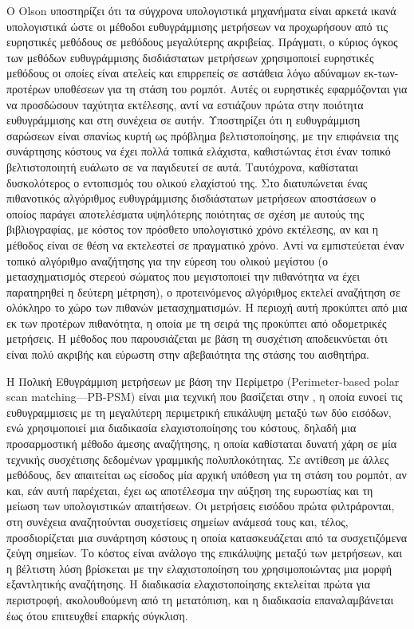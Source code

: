 Ο Olson \cite{Olson2009a} υποστηρίζει ότι τα σύγχρονα υπολογιστικά μηχανήματα
είναι αρκετά ικανά υπολογιστικά ώστε οι μέθοδοι ευθυγράμμισης μετρήσεων να
προχωρήσουν από τις ευρηστικές μεθόδους σε μεθόδους μεγαλύτερης ακριβείας.
Πράγματι, ο κύριος όγκος των μεθόδων ευθυγράμμισης δισδιάστατων μετρήσεων
χρησιμοποιεί ευρηστικές μεθόδους οι οποίες είναι ατελείς και επιρρεπείς σε
αστάθεια λόγω αδύναμων εκ-των-προτέρων υποθέσεων για τη στάση του ρομπότ. Αυτές
οι ευρηστικές εφαρμόζονται για να προσδώσουν ταχύτητα εκτέλεσης, αντί να
εστιάζουν πρώτα στην ποιότητα ευθυγράμμισης και στη συνέχεια σε αυτήν.
Υποστηρίζει ότι η ευθυγράμμιση σαρώσεων είναι σπανίως κυρτή ως πρόβλημα
βελτιστοποίησης, με την επιφάνεια της συνάρτησης κόστους να έχει πολλά τοπικά
ελάχιστα, καθιστώντας έτσι έναν τοπικό βελτιστοποιητή ευάλωτο σε να παγιδευτεί
σε αυτά. Ταυτόχρονα, καθίσταται δυσκολότερος ο εντοπισμός του ολικού ελαχίστού
της. Στο \cite{Olson2009a} διατυπώνεται ένας πιθανοτικός αλγόριθμος
ευθυγράμμισης δισδιάστατων μετρήσεων αποστάσεων ο οποίος παράγει αποτελέσματα
υψηλότερης ποιότητας σε σχέση με αυτούς της βιβλιογραφίας, με κόστος τον
πρόσθετο υπολογιστικό χρόνο εκτέλεσης, αν και η μέθοδος είναι σε θέση να
εκτελεστεί σε πραγματικό χρόνο.  Αντί να εμπιστεύεται έναν τοπικό αλγόριθμο
αναζήτησης για την εύρεση του ολικού μεγίστου (ο μετασχηματισμός στερεού
σώματος που μεγιστοποιεί την πιθανότητα να έχει παρατηρηθεί η δεύτερη μέτρηση),
ο προτεινόμενος αλγόριθμος εκτελεί αναζήτηση σε ολόκληρο το χώρο των πιθανών
μετασχηματισμών. Η περιοχή αυτή προκύπτει από μια εκ των προτέρων πιθανότητα, η
οποία με τη σειρά της προκύπτει από οδομετρικές μετρήσεις. Η μέθοδος που
παρουσιάζεται με βάση τη συσχέτιση αποδεικνύεται ότι είναι πολύ ακριβής και
εύρωστη στην αβεβαιότητα της στάσης του αισθητήρα.

Η Πολική Εθυγράμμιση μετρήσεων με βάση την Περίμετρο (Perimeter-based polar
scan matching---PB-PSM) \cite{Friedman2015} είναι μια τεχνική που βασίζεται
στην \cite{Diosi2005}, η οποία ευνοεί τις ευθυγραμμισεις με τη μεγαλύτερη
περιμετρική επικάλυψη μεταξύ των δύο εισόδων, ενώ χρησιμοποιεί μια διαδικασία
ελαχιστοποίησης του κόστους, δηλαδή μια προσαρμοστική μέθοδο άμεσης αναζήτησης,
η οποία καθίσταται δυνατή χάρη σε μία τεχνικής συσχέτισης δεδομένων γραμμικής
πολυπλοκότητας. Σε αντίθεση με άλλες μεθόδους, δεν απαιτείται ως είσοδος μία
αρχική υπόθεση για τη στάση του ρομπότ, αν και, εάν αυτή παρέχεται, έχει ως
αποτέλεσμα την αύξηση της ευρωστίας και τη μείωση των υπολογιστικών απαιτήσεων.
Οι μετρήσεις εισόδου πρώτα φιλτράρονται, στη συνέχεια αναζητούνται συσχετίσεις
σημείων ανάμεσά τους και, τέλος, προσδιορίζεται μια συνάρτηση κόστους η οποία
κατασκευάζεται από τα συσχετιζόμενα ζεύγη σημείων. Το κόστος είναι ανάλογο της
επικάλυψης μεταξύ των μετρήσεων, και η βέλτιστη λύση βρίσκεται με την
ελαχιστοποίηση του χρησιμοποιώντας μια μορφή εξαντλητικής αναζήτησης. Η
διαδικασία ελαχιστοποίησης εκτελείται πρώτα για περιστροφή, ακολουθούμενη από
τη μετατόπιση, και η διαδικασία επαναλαμβάνεται έως ότου επιτευχθεί επαρκής
σύγκλιση.

